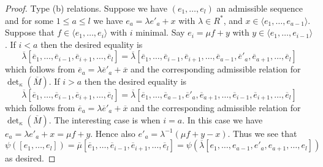 \begin{proof}
\medskip\noindent
Type (b) relations. Suppose we have $(e_1, \ldots, e_l)$ an
admissible sequence and for some $1 \leq a \leq l$ we have
$e_a = \lambda e'_a + x$ with $\lambda \in R^*$, and
$x \in \langle e_1, \ldots, e_{a - 1}\rangle$.
Suppose that $f \in \langle e_1, \ldots, e_i\rangle$ with $i$ minimal.
Say $e_i = \mu f + y$ with $y \in \langle e_1, \ldots, e_{i - 1}\rangle$.
If $i < a$ then the desired equality is
$$
\overline{\lambda}
[\overline{e}_1,
\ldots,
\overline{e}_{i - 1},
\overline{e}_{i + 1},
\ldots,
\overline{e}_l]
=
\overline{\lambda}
[\overline{e}_1,
\ldots,
\overline{e}_{i - 1},
\overline{e}_{i + 1},
\ldots,
\overline{e}_{a - 1},
\overline{e}'_a,
\overline{e}_{a + 1},
\ldots,
\overline{e}_l]
$$
which follows from $\overline{e}_a = \lambda \overline{e}'_a + \overline{x}$
and the corresponding admissible relation for $\det_\kappa(\overline{M})$.
If $i > a$ then the desired equality is
$$
\overline{\lambda}
[\overline{e}_1,
\ldots,
\overline{e}_{i - 1},
\overline{e}_{i + 1},
\ldots,
\overline{e}_l]
=
\overline{\lambda}
[\overline{e}_1,
\ldots,
\overline{e}_{a - 1},
\overline{e}'_a,
\overline{e}_{a + 1},
\ldots,
\overline{e}_{i - 1},
\overline{e}_{i + 1},
\ldots,
\overline{e}_l]
$$
which follows from $\overline{e}_a = \lambda \overline{e}'_a + \overline{x}$
and the corresponding admissible relation for $\det_\kappa(\overline{M})$.
The interesting case is when $i = a$. In this case we have
$e_a = \lambda e'_a + x = \mu f + y$. Hence also
$e'_a = \lambda^{-1}(\mu f + y - x)$. Thus we see that
$$
\psi([e_1, \ldots, e_l])
= \overline{\mu}
[\overline{e}_1, \ldots,
\overline{e}_{i - 1},
\overline{e}_{i + 1}, \ldots, \overline{e}_l]
=
\psi(
\overline{\lambda}
[e_1, \ldots, e_{a - 1}, e'_a, e_{a + 1}, \ldots, e_l]
)
$$
as desired.


\end{proof}
